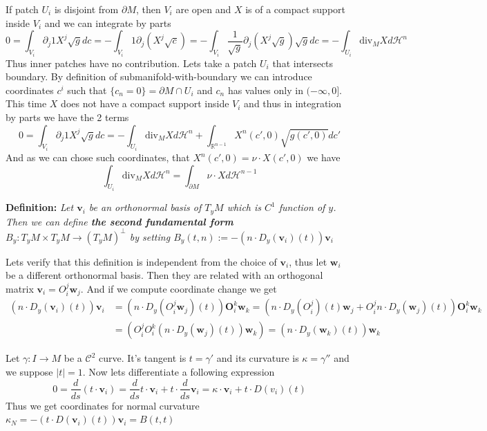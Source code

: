 \vspace{1ex}
If patch $U_i$ is disjoint from $\partial M$, then $V_i$ are open and $X$ is of
a compact support inside $V_i$ and we can integrate by parts
\[0=\int_{V_i}\partial_j 1X^j\sqrt gdc=-\int_{V_i}1\partial_j(X^j\sqrt c)=
-\int_{V_i}\frac{1}{\sqrt g}\partial_j(X^j\sqrt g)\sqrt gdc=-\int_{U_i}\text{div}_M Xd\mathcal H^n\]
Thus inner patches have no contribution. Lets take a patch $U_i$ that intersects
boundary. By definition of submanifold-with-boundary we can introduce coordinates
$c^i$ such that $\{c_n=0\}=\partial M\cap U_i$ and $c_n$ has values only in
$(-\infty,0]$. This time $X$ does not have a compact support inside $V_i$ and
thus in integration by parts we have the 2 terms
\[0=\int_{V_i}\partial_j 1X^j\sqrt gdc=-\int_{U_i}\text{div}_M Xd\mathcal H^n+\int_{\mathbb R^{n-1}}X^n(c',0)\sqrt{g(c',0)}dc'\]
And as we can chose such coordinates, that $X^n(c',0)=\nu\cdot X(c',0)$ we have
\[\int_{U_i}\text{div}_M Xd\mathcal H^n=\int_{\partial M}\nu\cdot Xd\mathcal H^{n-1}\]

\vspace{2ex}
\textbf{Definition:} \textit{Let $\mathbf{v}_i$ be an orthonormal basis of $T_yM$ which
is $C^1$ function of $y$. Then we can define \textbf{the second fundamental form}
$B_y:T_yM\times T_yM\rightarrow (T_yM)^\perp$ by setting $B_y(t,n):=-(n\cdot D_y
(\mathbf v_i)(t))\mathbf v_i$
}

\vspace{2ex} Lets verify that this definition is independent from the choice of
$\mathbf v_i$, thus let $\mathbf w_i$ be a different orthonormal basis. Then
they are related with an orthogonal matrix $\mathbf v_i=O_i^j\mathbf w_j$. And
if we compute coordinate change we get
\begin{align*}
    (n\cdot D_y(\mathbf v_i)(t))\mathbf v_i&=(n\cdot D_y(O_i^j\mathbf w_j)(t))\mathbf O_i^k\mathbf w_k
=(n\cdot D_y(O_i^j)(t)\mathbf w_j + O_i^j n\cdot D_y(\mathbf w_j)(t))\mathbf O_i^k\mathbf w_k\\
    &=(O_i^jO_i^k(n\cdot D_y(\mathbf w_j)(t))\mathbf w_k)=(n\cdot D_y(\mathbf w_k)(t))\mathbf w_k
\end{align*}

\vspace{2ex}
Let $\gamma:I\rightarrow M$ be a $\mathcal C^2$ curve. It's tangent is $t=\gamma'$
and its curvature is $\kappa=\gamma''$ and we suppose $|t|=1$. Now lets
differentiate a following expression
\[0=\frac{d}{ds}(t\cdot\mathbf v_i)=\frac{d}{ds}t\cdot\mathbf v_i+t\cdot\frac{d}{ds}\mathbf v_i=\kappa\cdot\mathbf v_i+t\cdot D(v_i)(t)\]
Thus we get coordinates for normal curvature
$\kappa_N = -(t\cdot D(\mathbf v_i)(t))\mathbf v_i=B(t,t)$

